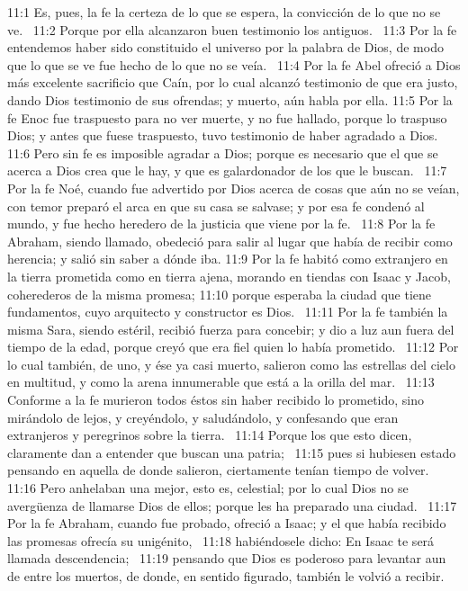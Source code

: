11:1 Es, pues, la fe la certeza de lo que se espera, la convicción de lo que no se ve.  
11:2 Porque por ella alcanzaron buen testimonio los antiguos.  
11:3 Por la fe entendemos haber sido constituido el universo por la palabra de Dios, de modo que lo que se ve fue hecho de lo que no se veía.  
11:4 Por la fe Abel ofreció a Dios más excelente sacrificio que Caín, por lo cual alcanzó testimonio de que era justo, dando Dios testimonio de sus ofrendas; y muerto, aún habla por ella. 
11:5 Por la fe Enoc fue traspuesto para no ver muerte, y no fue hallado, porque lo traspuso Dios; y antes que fuese traspuesto, tuvo testimonio de haber agradado a Dios. 
11:6 Pero sin fe es imposible agradar a Dios; porque es necesario que el que se acerca a Dios crea que le hay, y que es galardonador de los que le buscan.  
11:7 Por la fe Noé, cuando fue advertido por Dios acerca de cosas que aún no se veían, con temor preparó el arca en que su casa se salvase; y por esa fe condenó al mundo, y fue hecho heredero de la justicia que viene por la fe.  
11:8 Por la fe Abraham, siendo llamado, obedeció para salir al lugar que había de recibir como herencia; y salió sin saber a dónde iba. 
11:9 Por la fe habitó como extranjero en la tierra prometida como en tierra ajena, morando en tiendas con Isaac y Jacob, coherederos de la misma promesa; 
11:10 porque esperaba la ciudad que tiene fundamentos, cuyo arquitecto y constructor es Dios.  
11:11 Por la fe también la misma Sara, siendo estéril, recibió fuerza para concebir; y dio a luz aun fuera del tiempo de la edad, porque creyó que era fiel quien lo había prometido.  
11:12 Por lo cual también, de uno, y ése ya casi muerto, salieron como las estrellas del cielo en multitud, y como la arena innumerable que está a la orilla del mar.  
11:13 Conforme a la fe murieron todos éstos sin haber recibido lo prometido, sino mirándolo de lejos, y creyéndolo, y saludándolo, y confesando que eran extranjeros y peregrinos sobre la tierra.  
11:14 Porque los que esto dicen, claramente dan a entender que buscan una patria;  
11:15 pues si hubiesen estado pensando en aquella de donde salieron, ciertamente tenían tiempo de volver.  
11:16 Pero anhelaban una mejor, esto es, celestial; por lo cual Dios no se avergüenza de llamarse Dios de ellos; porque les ha preparado una ciudad.  
11:17 Por la fe Abraham, cuando fue probado, ofreció a Isaac; y el que había recibido las promesas ofrecía su unigénito,  
11:18 habiéndosele dicho: En Isaac te será llamada descendencia;  
11:19 pensando que Dios es poderoso para levantar aun de entre los muertos, de donde, en sentido figurado, también le volvió a recibir.  

